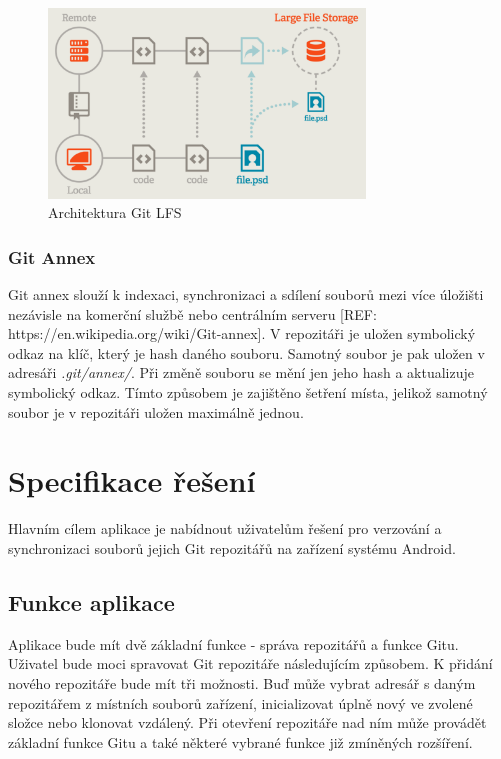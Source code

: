 \begin{figure}[h!]
    \centering
    \vspace{0.5cm}
    \includegraphics[width=0.75\textwidth,height=0.75\textheight,keepaspectratio]{obrazky-figures/git-lfs.pdf}
    \caption{Architektura Git LFS}
    \label{diagram:git-lfs}
\end{figure}

\subsection{Git Annex}
Git annex slouží k indexaci, synchronizaci a sdílení souborů mezi více úložišti nezávisle na komerční službě nebo centrálním serveru [REF: https://en.wikipedia.org/wiki/Git-annex]. V repozitáři je uložen symbolický odkaz na klíč, který je hash daného souboru. Samotný soubor je pak uložen v adresáři \emph{.git/annex/}. Při změně souboru se mění jen jeho hash a aktualizuje symbolický odkaz. Tímto způsobem je zajištěno šetření místa, jelikož samotný soubor je v repozitáři uložen maximálně jednou.

\chapter{Specifikace řešení}
Hlavním cílem aplikace je nabídnout uživatelům řešení pro verzování a synchronizaci souborů jejich Git repozitářů na zařízení systému Android.

\section{Funkce aplikace}
Aplikace bude mít dvě základní funkce - správa repozitářů a funkce Gitu. Uživatel bude moci spravovat Git repozitáře následujícím způsobem. K přidání nového repozitáře bude mít tři možnosti. Buď může vybrat adresář s daným repozitářem z místních souborů zařízení, inicializovat úplně nový ve zvolené složce nebo klonovat vzdálený. Při otevření repozitáře nad ním může provádět základní funkce Gitu a také některé vybrané funkce již zmíněných rozšíření.

